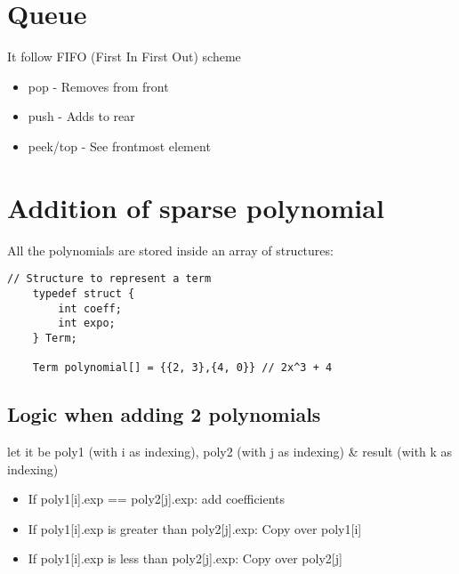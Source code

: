 \documentclass{article}
\begin{document}
\section{Queue}
It follow FIFO (First In First Out) scheme
\begin{itemize}
    \item pop - Removes from front
    \item push - Adds to rear
    \item peek/top - See frontmost element
\end{itemize}

\section{Addition of sparse polynomial}

All the polynomials are stored inside an array of structures:
\begin{lstlisting}[caption={Sparse Polynomial Addition Outline}]
    // Structure to represent a term
    typedef struct {
        int coeff;
        int expo;
    } Term;

    Term polynomial[] = {{2, 3},{4, 0}} // 2x^3 + 4
\end{lstlisting}

\subsection{Logic when adding 2 polynomials}
let it be poly1 (with i as indexing),  poly2 (with j as indexing) \&  result (with k as indexing)

\begin{itemize}
    \item If poly1[i].exp ==  poly2[j].exp: add coefficients
    \item If poly1[i].exp is greater than poly2[j].exp: Copy over poly1[i]
    \item If poly1[i].exp is less than poly2[j].exp: Copy over poly2[j]
\end{itemize}
\end{document}
